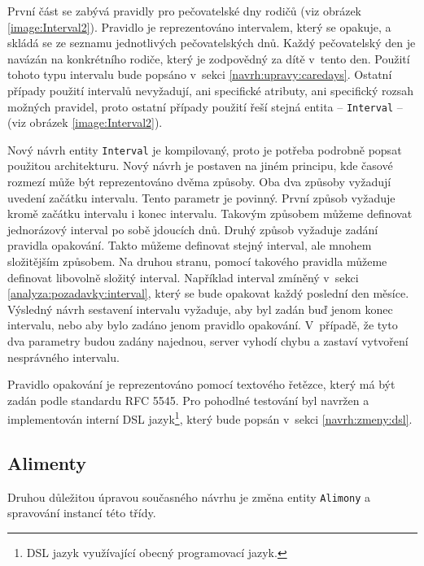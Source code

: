         První část se zabývá pravidly pro pečovatelské dny rodičů (viz obrázek \ref{image:Interval2}). Pravidlo je reprezentováno intervalem, který se opakuje, a skládá se ze seznamu jednotlivých pečovatelských dnů. Každý pečovatelský den je navázán na konkrétního rodiče, který je zodpovědný za dítě v~tento den. Použití tohoto typu intervalu bude popsáno v~sekci \ref{navrh:upravy:caredays}. Ostatní případy použití intervalů nevyžadují, ani specifické atributy, ani specifický rozsah možných pravidel, proto ostatní případy použití řeší stejná entita -- \verb|Interval| -- (viz obrázek \ref{image:Interval2}).
        
    
        Nový návrh entity \verb|Interval| je kompilovaný, proto je potřeba podrobně popsat použitou architekturu. Nový návrh je postaven na jiném principu, kde časové rozmezí může být reprezentováno dvěma způsoby. Oba dva způsoby vyžadují uvedení začátku intervalu. Tento parametr je povinný. První způsob vyžaduje kromě začátku intervalu i konec intervalu. Takovým způsobem můžeme definovat jednorázový interval po sobě jdoucích dnů. Druhý způsob vyžaduje zadání pravidla opakování. Takto můžeme definovat stejný interval, ale mnohem složitějším způsobem. Na druhou stranu, pomocí takového pravidla můžeme definovat libovolně složitý interval. 
        Například interval zmíněný v~sekci \ref{analyza:pozadavky:interval}, který se bude opakovat každý poslední den měsíce. Výsledný návrh sestavení intervalu vyžaduje, aby byl zadán buď jenom konec intervalu, nebo aby bylo zadáno jenom pravidlo opakování. V~případě, že tyto dva parametry budou zadány najednou, server vyhodí chybu a zastaví vytvoření nesprávného intervalu.
    
        Pravidlo opakování je reprezentováno pomocí textového řetězce, který má být zadán podle standardu {RFC 5545}\cite{recurrence-rule}. Pro pohodlné testování byl navržen a implementován {interní DSL jazyk}\footnote{DSL jazyk využívající obecný programovací jazyk.}, který bude popsán v~sekci \ref{navrh:zmeny:dsl}.
        
    \subsection{Alimenty}\label{navrh:upravy:alimenty}
        Druhou důležitou úpravou současného návrhu je změna entity \verb|Alimony| a spravování instancí této třídy.
    
